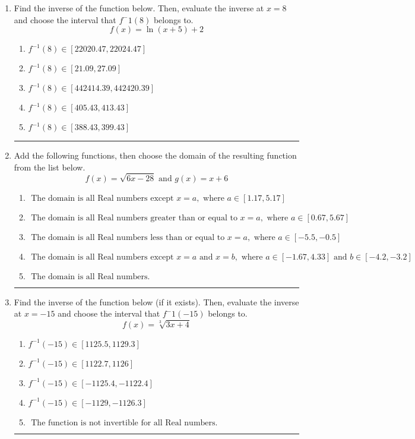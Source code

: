 \documentclass[14pt]{extbook}
\newcommand{\litem}[1]{\item#1\hspace*{-1cm}\rule{\textwidth}{0.4pt}}
\begin{document}
\begin{enumerate}
{\begin{enumerate}[label=\Alph*.]
\end{enumerate} }
\litem{
Find the inverse of the function below. Then, evaluate the inverse at $x = 8$ and choose the interval that $f^-1(8)$ belongs to.\[ f(x) = \ln{(x+5)}+2 \]\begin{enumerate}[label=\Alph*.]
\item \( f^{-1}(8) \in [22020.47, 22024.47] \)
\item \( f^{-1}(8) \in [21.09, 27.09] \)
\item \( f^{-1}(8) \in [442414.39, 442420.39] \)
\item \( f^{-1}(8) \in [405.43, 413.43] \)
\item \( f^{-1}(8) \in [388.43, 399.43] \)

\end{enumerate} }
\litem{
Add the following functions, then choose the domain of the resulting function from the list below.\[ f(x) = \sqrt{6x-28}  \text{ and } g(x) = x + 6 \]\begin{enumerate}[label=\Alph*.]
\item \( \text{ The domain is all Real numbers except } x = a, \text{ where } a \in [1.17, 5.17] \)
\item \( \text{ The domain is all Real numbers greater than or equal to } x = a, \text{ where } a \in [0.67, 5.67] \)
\item \( \text{ The domain is all Real numbers less than or equal to } x = a, \text{ where } a \in [-5.5, -0.5] \)
\item \( \text{ The domain is all Real numbers except } x = a \text{ and } x = b, \text{ where } a \in [-1.67, 4.33] \text{ and } b \in [-4.2, -3.2] \)
\item \( \text{ The domain is all Real numbers. } \)

\end{enumerate} }
\litem{
Find the inverse of the function below (if it exists). Then, evaluate the inverse at $x = -15$ and choose the interval that $f^-1(-15)$ belongs to.\[ f(x) = \sqrt[3]{3 x + 4} \]\begin{enumerate}[label=\Alph*.]
\item \( f^{-1}(-15) \in [1125.5, 1129.3] \)
\item \( f^{-1}(-15) \in [1122.7, 1126] \)
\item \( f^{-1}(-15) \in [-1125.4, -1122.4] \)
\item \( f^{-1}(-15) \in [-1129, -1126.3] \)
\item \( \text{ The function is not invertible for all Real numbers. } \)


\end{enumerate}}
\end{enumerate}
\end{document}
